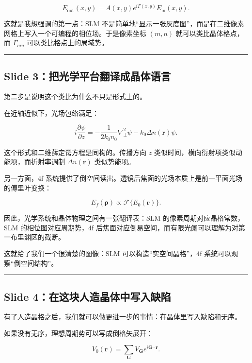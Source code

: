 \documentclass[UTF8,fontset=none,12pt]{ctexart}
\begin{document}
\[
E_{\mathrm{out}}(x,y)=A(x,y)e^{i\Gamma(x,y)}E_{\mathrm{in}}(x,y).
\]

这就是我想强调的第一点：SLM 不是简单地“显示一张灰度图”，而是在二维像素网格上写入一个可编程的相位场。于是像素坐标 $(m,n)$ 就可以类比晶体格点，而 $\Gamma_{mn}$ 可以类比格点上的局域势。\par

\bigskip\hrule\bigskip

\subsection*{Slide 3：把光学平台翻译成晶体语言}

第二步是说明这个类比为什么不只是形式上的。\par

在近轴近似下，光场包络满足：\par

\[
i\frac{\partial\psi}{\partial z}
=-\frac{1}{2k_0n_0}\nabla_\perp^2\psi
-k_0\Delta n(\mathbf r)\psi .
\]

这个形式和二维薛定谔方程是同构的。传播方向 $z$ 类似时间，横向衍射项类似动能项，而折射率调制 $\Delta n(\mathbf r)$ 类似势能项。\par

另一方面，4f 系统提供了倒空间读出。透镜后焦面的光场本质上是前一平面光场的傅里叶变换：\par

\[
E_f(\boldsymbol\rho)\propto \mathcal F\{E_0(\mathbf r)\}.
\]

因此，光学系统和晶体物理之间有一张翻译表：SLM 的像素周期对应晶格常数，SLM 的相位图对应周期势，4f 后焦面对应倒易空间，而有限光阑可以理解为对第一布里渊区的截断。\par

这就给了我们一个很清楚的图像：SLM 可以构造“实空间晶格”，4f 系统可以观察“倒空间结构”。\par

\bigskip\hrule\bigskip

\subsection*{Slide 4：在这块人造晶体中写入缺陷}

有了人造晶格之后，我们就可以做更进一步的事情：在晶体里写入缺陷和无序。\par

如果没有无序，理想周期势可以写成倒格矢展开：\par

\[
V_0(\mathbf r)=\sum_{\mathbf G}V_{\mathbf G}e^{i\mathbf G\cdot\mathbf r}.
\]
\end{document}
